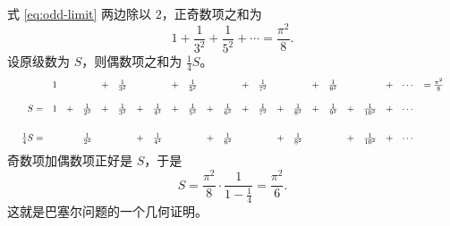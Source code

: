 式 \eqref{eq:odd-limit} 两边除以 $2$，正奇数项之和为
\begin{equation}
  1+\frac{1}{3^{2}}+\frac{1}{5^{2}}+\cdots=\frac{\pi^{2}}{8}.
  \label{eq:odd}
\end{equation}
设原级数为 $S$，则偶数项之和为 $\frac14 S$。
\begin{equation}
  \resizebox{\textwidth}{!}{$
  \begin{array}{r*{21}{c}r}
    &1&&&+&\frac{1}{3^{2}}&&&+&\frac{1}{5^{2}}&&&+&\frac{1}{7^{2}}&&&+&\frac{1}{9^{2}}
    &&&+&\cdots&=\frac{\pi^{2}}{8}\\[14pt]
    S=&1&+&\frac{1}{2^{2}}&+&\frac{1}{3^{2}}&+&\frac{1}{4^{2}}&+&\frac{1}{5^{2}}
    &+&\frac{1}{6^{2}}&+&\frac{1}{7^{2}}&+&\frac{1}{8^{2}}&+&\frac{1}{9^{2}}
    &+&\frac{1}{10^{2}}&+&\cdots&\\[20pt]
    \frac{1}{4}S=&&&\frac{1}{2^{2}}&&&+&\frac{1}{4^{2}}&&&+&\frac{1}{6^{2}}
    &&&+&\frac{1}{8^{2}}&&&+&\frac{1}{10^{2}}&+&\cdots&
  \end{array}$}
  \label{eq:odd-even}
\end{equation}
奇数项加偶数项正好是 $S$，于是
\begin{equation}
  S=\frac{\pi^{2}}{8}\cdot\frac{1}{1-\frac14}=\frac{\pi^{2}}{6}.
\end{equation}
这就是巴塞尔问题的一个几何证明。
